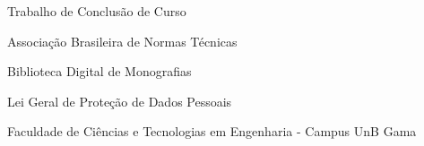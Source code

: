 \begin{siglas}
  \item [TCC] Trabalho de Conclusão de Curso
  \item [ABNT] Associação Brasileira de Normas Técnicas
  \item [BDM] Biblioteca Digital de Monografias  
  \item [LGPD] Lei Geral de Proteção de Dados Pessoais
  \item [FCTE] Faculdade de Ciências e Tecnologias em Engenharia - Campus UnB Gama
  

\end{siglas}
